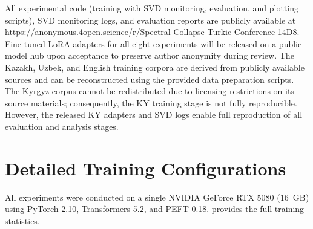 \documentclass[11pt]{article}
\begin{document}
All experimental code (training with SVD monitoring, evaluation, and plotting scripts), SVD monitoring logs, and evaluation reports are publicly available at \url{https://anonymous.4open.science/r/Spectral-Collapse-Turkic-Conference-14D8}. Fine-tuned LoRA adapters for all eight experiments will be released on a public model hub upon acceptance to preserve author anonymity during review. The Kazakh, Uzbek, and English training corpora are derived from publicly available sources and can be reconstructed using the provided data preparation scripts. The Kyrgyz corpus cannot be redistributed due to licensing restrictions on its source materials; consequently, the KY training stage is not fully reproducible. However, the released KY adapters and SVD logs enable full reproduction of all evaluation and analysis stages.



\appendix

\section{Detailed Training Configurations}
\label{app:configs}

All experiments were conducted on a single NVIDIA GeForce RTX 5080 (16~GB) using PyTorch 2.10, Transformers 5.2, and PEFT 0.18.  provides the full training statistics.
\end{document}
